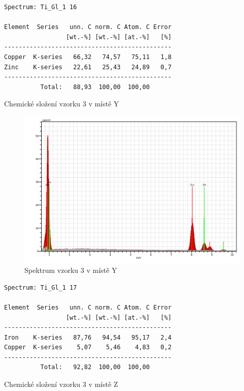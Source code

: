 \begin{tabulka}[htbp]
\centering
\begin{BVerbatim}
Spectrum: Ti_Gl_1 16

Element  Series   unn. C norm. C Atom. C Error
                 [wt.-%] [wt.-%] [at.-%]   [%]
----------------------------------------------
Copper  K-series   66,32   74,57   75,11   1,8
Zinc    K-series   22,61   25,43   24,89   0,7
----------------------------------------------
          Total:   88,93  100,00  100,00
\end{BVerbatim}
\caption{Chemické složení vzorku 3 v místě Y}
\label{t:vz03_Y}
\end{tabulka}

\begin{figure}[htbp]
\centering
\includegraphics[width=12cm]{graficos/3/Ysp.png}
\caption{Spektrum vzorku 3 v místě Y}
\label{o:vz3_Y}
\end{figure}

\begin{tabulka}[htbp]
\centering
\begin{BVerbatim}
Spectrum: Ti_Gl_1 17

Element  Series   unn. C norm. C Atom. C Error
                 [wt.-%] [wt.-%] [at.-%]   [%]
----------------------------------------------
Iron    K-series   87,76   94,54   95,17   2,4
Copper  K-series    5,07    5,46    4,83   0,2
----------------------------------------------
          Total:   92,82  100,00  100,00
\end{BVerbatim}
\caption{Chemické složení vzorku 3 v místě Z}
\label{t:vz03_Z}
\end{tabulka}

